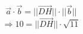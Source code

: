 \documentclass{article}
\begin{document}
\[ \vec{a} \cdot \vec{b} = ||\vec{DH}|| \cdot ||\vec{b}|| \]
\[ \Rightarrow 10 = ||\vec{DH}|| \cdot \sqrt{11} \]
\end{document}

